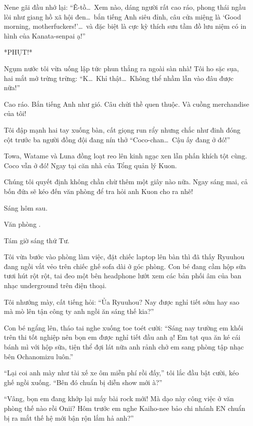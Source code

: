 \documentclass[../main.tex]{subfiles}
\begin{document}
Nene gãi đầu nhớ lại: ``Ê-tồ\dots\ Xem nào, dáng người rất cao ráo, phong thái ngầu lòi như giang hồ xã hội đen\dots\ bắn tiếng Anh siêu đỉnh, câu cửa miệng là `Good morning, motherfuckers!'\dots\ và đặc biệt là cực kỳ thích sưu tầm đồ lưu niệm có in hình của Kanata-senpai ạ!''

*PHỤT!*

Ngụm nước tôi vừa uống lập tức phun thẳng ra ngoài sàn nhà! Tôi ho sặc sụa, hai mắt mở trừng trừng: ``K\dots\ Khỉ thật\dots\ Không thể nhầm lẫn vào đâu được nữa!''

Cao ráo. Bắn tiếng Anh như gió. Câu chửi thề quen thuộc. Và cuồng merchandise của tôi!

Tôi đập mạnh hai tay xuống bàn, cất giọng run rẩy nhưng chắc như đinh đóng cột trước ba người đồng đội đang nín thở ``Coco-chan\dots\ Cậu ấy đang ở đó!''

Towa, Watame và Luna đồng loạt reo lên kinh ngạc xen lẫn phấn khích tột cùng. Coco vẫn ở đó! Ngay tại căn nhà của Tổng quản lý Kuon.

Chúng tôi quyết định không chần chừ thêm một giây nào nữa. Ngay sáng mai, cả bốn đứa sẽ kéo đến văn phòng để tra hỏi anh Kuon cho ra nhẽ!


\begin{center}
    Sáng hôm sau.

    Văn phòng \hll.
\end{center}

Tám giờ sáng thứ Tư.

Tôi vừa bước vào phòng làm việc, đặt chiếc laptop lên bàn thì đã thấy Ryuuhou đang ngồi vắt vẻo trên chiếc ghế sofa dài ở góc phòng. Con bé đang cầm hộp sữa tươi hút rột rột, tai đeo một bên headphone lướt xem các bản phối âm của ban nhạc underground trên điện thoại.

Tôi nhướng mày, cất tiếng hỏi: ``Ủa Ryuuhou? Nay được nghỉ tiết sớm hay sao mà mò lên tận công ty anh ngồi ăn sáng thế kia?''

Con bé ngẩng lên, tháo tai nghe xuống toe toét cười: ``Sáng nay trường em khối trên thi tốt nghiệp nên bọn em được nghỉ tiết đầu anh ạ! Em tạt qua ăn ké cái bánh mì với hộp sữa, tiện thể đợi lát nữa anh rảnh chở em sang phòng tập nhạc bên Ochanomizu luôn.''

``Lại coi anh mày như tài xế xe ôm miễn phí rồi đấy,'' tôi lắc đầu bật cười, kéo ghế ngồi xuống. ``Bên đó chuẩn bị diễn show mới à?''

``Vâng, bọn em đang khớp lại mấy bài rock mới! Mà dạo này công việc ở văn phòng thế nào rồi Onii? Hôm trước em nghe Kaiho-nee bảo chi nhánh EN chuẩn bị ra mắt thế hệ mới bận rộn lắm hả anh?''
\end{document}

